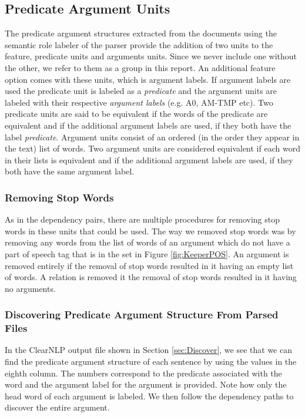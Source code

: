 \documentclass[11pt]{article}
\begin{document}
\subsection{Predicate Argument Units}

The predicate argument structures extracted from the documents using the semantic role labeler of the parser provide the addition of two units to the feature, predicate units and arguments units. Since we never include one without the other, we refer to them as a group in this report. An additional feature option comes with these units, which is argument labels. If argument labels are used the predicate unit is labeled as a \emph{predicate} and the argument units are labeled with their respective \emph{argument labels} (e.g. A0, AM-TMP etc). Two predicate units are said to be equivalent if the words of the predicate are equivalent and if the additional argument labels are used, if they both have the label \emph{predicate}. Argument units consist of an ordered (in the order they appear in the text) list of words. Two argument units are considered equivalent if  each word in their lists is equivalent and if 
the additional argument labels are used, if they both have the same argument label. 

\subsubsection{Removing Stop Words}

As in the dependency pairs, there are multiple procedures for removing stop words in these units that could be used. The way we removed stop words was by removing any words from the list of words of an argument which do not have a part of speech tag that is in the set in Figure \ref{fig:KeeperPOS}. An argument is removed entirely if the removal of stop words resulted in it having an empty list of words. A relation is removed it the removal of stop words resulted in it having no arguments. 

\subsubsection{Discovering Predicate Argument Structure From Parsed Files} 

In the ClearNLP output file shown in Section \ref{sec:Discover}, we see that we can find the predicate argument structure of each sentence by using the values in the eighth column. The numbers correspond to the predicate associated with the word and the argument label for the argument is provided. Note how only the head word of each argument is labeled. We then follow the dependency paths to discover the entire argument. 
\end{document}
